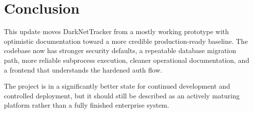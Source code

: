 \documentclass[12pt,a4paper]{report}
\begin{document}
\chapter{Conclusion}

This update moves DarkNetTracker from a mostly working prototype with optimistic documentation toward a more credible production-ready baseline. The codebase now has stronger security defaults, a repeatable database migration path, more reliable subprocess execution, cleaner operational documentation, and a frontend that understands the hardened auth flow.

The project is in a significantly better state for continued development and controlled deployment, but it should still be described as an actively maturing platform rather than a fully finished enterprise system.
\end{document}
